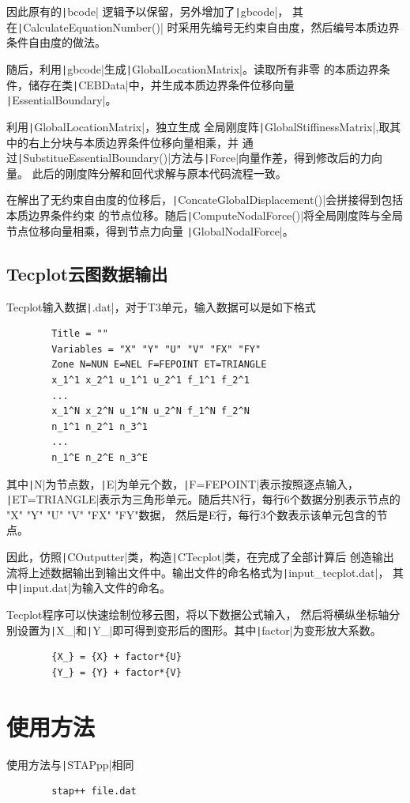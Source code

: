 \documentclass[12pt,a4paper]{article}
\newcommand{\code}{\texttt}
\begin{document}
因此原有的\texttt|bcode|
逻辑予以保留，另外增加了\texttt|gbcode|，
其在\texttt|CalculateEquationNumber()|
时采用先编号无约束自由度，然后编号本质边界条件自由度的做法。

随后，利用\code|gbcode|生成\code|GlobalLocationMatrix|。读取所有非零
的本质边界条件，储存在类\code|CEBData|中，并生成本质边界条件位移向量
\code|EssentialBoundary|。

利用\code|GlobalLocationMatrix|，独立生成
全局刚度阵\code|GlobalStiffinessMatrix|,取其中的右上分块与本质边界条件位移向量相乘，并
通过\code|SubstitueEssentialBoundary()|方法与\code|Force|向量作差，得到修改后的力向量。
此后的刚度阵分解和回代求解与原本代码流程一致。

在解出了无约束自由度的位移后，\code|ConcateGlobalDisplacement()|会拼接得到包括本质边界条件约束
的节点位移。随后\code|ComputeNodalForce()|将全局刚度阵与全局节点位移向量相乘，得到节点力向量
\code|GlobalNodalForce|。

\subsection{Tecplot云图数据输出}
Tecplot输入数据\code|.dat|，对于T3单元，输入数据可以是如下格式
\begin{verbatim}
        Title = ""
        Variables = "X" "Y" "U" "V" "FX" "FY"
        Zone N=NUN E=NEL F=FEPOINT ET=TRIANGLE
        x_1^1 x_2^1 u_1^1 u_2^1 f_1^1 f_2^1
        ...
        x_1^N x_2^N u_1^N u_2^N f_1^N f_2^N
        n_1^1 n_2^1 n_3^1
        ...
        n_1^E n_2^E n_3^E
\end{verbatim}

其中\code|N|为节点数，\code|E|为单元个数，\code|F=FEPOINT|表示按照逐点输入，
\code|ET=TRIANGLE|表示为三角形单元。随后共N行，每行6个数据分别表示节点的
"X" "Y" "U" "V" "FX" "FY"数据，
然后是E行，每行3个数表示该单元包含的节点。

因此，仿照\code|COutputter|类，构造\code|CTecplot|类，在完成了全部计算后
创造输出流将上述数据输出到输出文件中。输出文件的命名格式为\code|input_tecplot.dat|，
其中\code|input.dat|为输入文件的命名。

Tecplot程序可以快速绘制位移云图，将以下数据公式输入，
然后将横纵坐标轴分别设置为\code|X_|和\code|Y_|即可得到变形后的图形。其中\code|factor|为变形放大系数。
\begin{verbatim}
        {X_} = {X} + factor*{U}
        {Y_} = {Y} + factor*{V}
\end{verbatim}

\section{使用方法}
使用方法与\code|STAPpp|相同
\begin{verbatim}
        stap++ file.dat
\end{verbatim}
\end{document}
